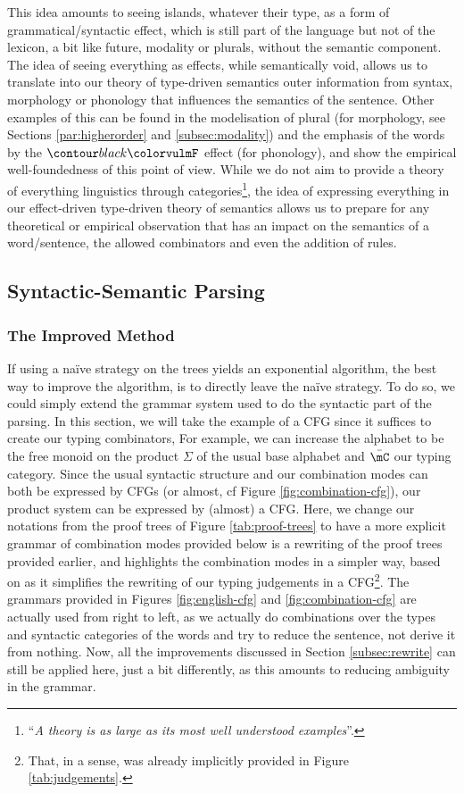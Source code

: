 This idea amounts to seeing islands, whatever their type, as a form of grammatical/syntactic effect, which is
still part of the language but not of the lexicon, a bit like future, modality or plurals, without the semantic
component.
The idea of seeing everything as effects, while semantically void, allows us to translate into our theory of
type-driven semantics outer information from syntax, morphology or phonology that influences the semantics of the
sentence.
Other examples of this can be found in the modelisation of plural (for morphology, see Sections \ref{par:higherorder}
and \ref{subsec:modality}) and the emphasis of the words by the $\f{F}$ effect (for phonology), and show the
empirical well-foundedness of this point of view.
While we do not aim to provide a theory of everything linguistics through categories\footnote{``\emph{A theory is as
		large as its most well understood examples}''.}, the idea of expressing everything in our effect-driven type-driven
theory of semantics allows us to prepare for any theoretical or empirical observation that has an impact on the
semantics of a word/sentence, the allowed combinators and even the addition of rules.

\subsection{Syntactic-Semantic Parsing}
\label{subsec:ssparsing}
\subsubsection{The Improved Method}
If using a naïve strategy on the trees yields an exponential algorithm,
the best way to improve the algorithm, is to directly leave the naïve strategy.
To do so, we could simply extend the grammar system used to do the syntactic
part of the parsing.
In this section, we will take the example of a CFG since it suffices to create
our typing combinators,
For example, we can increase the alphabet to be the free monoid on the product
$\Sigma$ of the usual base alphabet and $\bar{\mC}$ our typing category.
Since the usual syntactic structure and our combination modes can both be
expressed by CFGs (or almost, cf Figure \ref{fig:combination-cfg}), our product
system can be expressed by (almost) a CFG.
Here, we change our notations from the proof trees of Figure
\ref{tab:proof-trees} to have a more explicit grammar of combination modes
provided below is a rewriting of the proof trees provided earlier, and
highlights the combination modes in a simpler way, based on
\cite{bumfordEffectdrivenInterpretationFunctors2025} as it simplifies the
rewriting of our typing judgements in a CFG\footnote{That, in a sense, was
	already implicitly provided in Figure \ref{tab:judgements}.}.
The grammars provided  in Figures \ref{fig:english-cfg} and \ref{fig:combination-cfg}
are actually used from right to left, as we actually do combinations over the
types and syntactic categories of the words and try to reduce the sentence, not
derive it from nothing.
Now, all the improvements discussed in Section \ref{subsec:rewrite}
can still be applied here, just a bit differently, as this amounts to reducing
ambiguity in the grammar.

